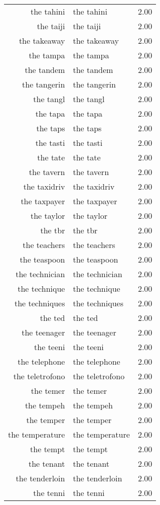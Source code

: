 \begin{table}[ht]
\begin{tabular}{rlr}
  the tahini & the tahini & 2.00 \\ 
  the taiji & the taiji & 2.00 \\ 
  the takeaway & the takeaway & 2.00 \\ 
  the tampa & the tampa & 2.00 \\ 
  the tandem & the tandem & 2.00 \\ 
  the tangerin & the tangerin & 2.00 \\ 
  the tangl & the tangl & 2.00 \\ 
  the tapa & the tapa & 2.00 \\ 
  the taps & the taps & 2.00 \\ 
  the tasti & the tasti & 2.00 \\ 
  the tate & the tate & 2.00 \\ 
  the tavern & the tavern & 2.00 \\ 
  the taxidriv & the taxidriv & 2.00 \\ 
  the taxpayer & the taxpayer & 2.00 \\ 
  the taylor & the taylor & 2.00 \\ 
  the tbr & the tbr & 2.00 \\ 
  the teachers & the teachers & 2.00 \\ 
  the teaspoon & the teaspoon & 2.00 \\ 
  the technician & the technician & 2.00 \\ 
  the technique & the technique & 2.00 \\ 
  the techniques & the techniques & 2.00 \\ 
  the ted & the ted & 2.00 \\ 
  the teenager & the teenager & 2.00 \\ 
  the teeni & the teeni & 2.00 \\ 
  the telephone & the telephone & 2.00 \\ 
  the teletrofono & the teletrofono & 2.00 \\ 
  the temer & the temer & 2.00 \\ 
  the tempeh & the tempeh & 2.00 \\ 
  the temper & the temper & 2.00 \\ 
  the temperature & the temperature & 2.00 \\ 
  the tempt & the tempt & 2.00 \\ 
  the tenant & the tenant & 2.00 \\ 
  the tenderloin & the tenderloin & 2.00 \\ 
  the tenni & the tenni & 2.00 \\ 

\end{tabular}
\end{table}
